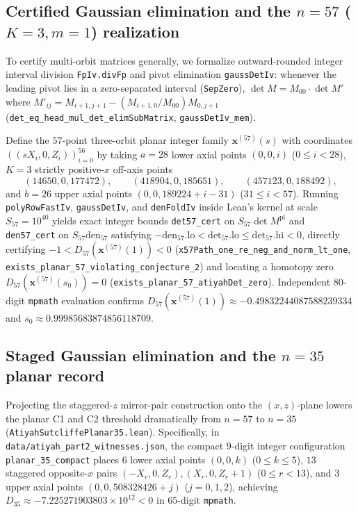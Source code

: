 \documentclass[11pt,reqno]{amsart}
\theoremstyle{remark}
\begin{document}
\subsection{Certified Gaussian elimination and the $n = 57$ ($K=3, m=1$) realization}\label{sec:n57}
To certify multi-orbit matrices generally, we formalize outward-rounded integer interval division \texttt{FpIv.divFp} and pivot elimination \texttt{gaussDetIv}: whenever the leading pivot lies in a zero-separated interval (\texttt{SepZero}), $\det M = M_{00} \cdot \det M'$ where $M'_{ij} = M_{i+1,j+1} - (M_{i+1,0}/M_{00}) M_{0,j+1}$ (\texttt{det\_eq\_head\_mul\_det\_elimSubMatrix}, \texttt{gaussDetIv\_mem}).

Define the $57$-point three-orbit planar integer family $\mathbf{x}^{(57)}(s)$ with coordinates $((s X_i, 0, Z_i))_{i=0}^{56}$ by taking $a = 28$ lower axial points $(0, 0, i)$ ($0 \le i < 28$), $K = 3$ strictly positive-$x$ off-axis points
\[
  (14650, 0, 177472), \qquad (418904, 0, 185651), \qquad (457123, 0, 188492),
\]
and $b = 26$ upper axial points $(0, 0, 189224 + i - 31)$ ($31 \le i < 57$).
Running \texttt{polyRowFastIv}, \texttt{gaussDetIv}, and \texttt{denFoldIv} inside Lean's kernel at scale $S_{57} = 10^{40}$ yields exact integer bounds \texttt{det57\_cert} on $S_{57}\det M^{\mathrm{pl}}$ and \texttt{den57\_cert} on $S_{57}\mathrm{den}_{57}$ satisfying $-\mathrm{den}_{57}.\mathrm{lo} < \mathrm{det}_{57}.\mathrm{lo} \le \mathrm{det}_{57}.\mathrm{hi} < 0$, directly certifying $-1 < D_{57}(\mathbf{x}^{(57)}(1)) < 0$ (\texttt{x57Path\_one\_re\_neg\_and\_norm\_lt\_one}, \texttt{exists\_planar\_57\_violating\_conjecture\_2}) and locating a homotopy zero $D_{57}(\mathbf{x}^{(57)}(s_0)) = 0$ (\texttt{exists\_planar\_57\_atiyahDet\_zero}).
Independent $80$-digit \texttt{mpmath} evaluation confirms $D_{57}(\mathbf{x}^{(57)}(1)) \approx -0.49832244087588239334$ and $s_0 \approx 0.99985683874856118709$.

\subsection{Staged Gaussian elimination and the $n = 35$ planar record}\label{sec:n35}
Projecting the staggered-$z$ mirror-pair construction onto the $(x, z)$-plane lowers the planar C1 and C2 threshold dramatically from $n = 57$ to $n = 35$ (\texttt{AtiyahSutcliffePlanar35.lean}).
Specifically, in \texttt{data/atiyah\_part2\_witnesses.json}, the compact $9$-digit integer configuration \texttt{planar\_35\_compact} places $6$ lower axial points $(0, 0, k)$ ($0 \le k \le 5$), $13$ staggered opposite-$x$ pairs $(-X_r, 0, Z_r), (X_r, 0, Z_r + 1)$ ($0 \le r < 13$), and $3$ upper axial points $(0, 0, 508328426 + j)$ ($j = 0, 1, 2$), achieving $D_{35} \approx -7.225271903803 \times 10^{12} < 0$ in $65$-digit \texttt{mpmath}.
\end{document}
